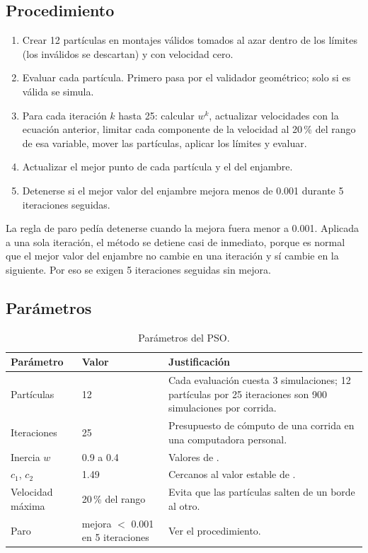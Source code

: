 \documentclass[11pt,letterpaper]{article}
\begin{document}
\begin{table}[H]
\centering
\caption{Límites de búsqueda de cada variable.}
\label{tab:limites}

\end{table}

\subsection{Procedimiento}
\begin{enumerate}
\item Crear 12 partículas en montajes válidos tomados al azar dentro de los límites (los inválidos se descartan) y con velocidad cero.
\item Evaluar cada partícula. Primero pasa por el validador geométrico; solo si es válida se simula.
\item Para cada iteración $k$ hasta 25: calcular $w^k$, actualizar velocidades con la ecuación anterior, limitar cada componente de la velocidad al 20\,\% del rango de esa variable, mover las partículas, aplicar los límites y evaluar.
\item Actualizar el mejor punto de cada partícula y el del enjambre.
\item Detenerse si el mejor valor del enjambre mejora menos de 0.001 durante 5 iteraciones seguidas.
\end{enumerate}

La regla de paro pedía detenerse cuando la mejora fuera menor a 0.001. Aplicada a una sola iteración, el método se detiene casi de inmediato, porque es normal que el mejor valor del enjambre no cambie en una iteración y sí cambie en la siguiente. Por eso se exigen 5 iteraciones seguidas sin mejora.

\subsection{Parámetros}
\begin{table}[H]
\centering
\caption{Parámetros del PSO.}
\begin{tabularx}{\textwidth}{llX}
\toprule
Parámetro & Valor & Justificación \\
\midrule
Partículas & 12 & Cada evaluación cuesta 3 simulaciones; 12 partículas por 25 iteraciones son 900 simulaciones por corrida. \\
Iteraciones & 25 & Presupuesto de cómputo de una corrida en una computadora personal. \\
Inercia $w$ & 0.9 a 0.4 & Valores de \citet{shi1998}. \\
$c_1$, $c_2$ & 1.49 & Cercanos al valor estable de \citet{clerc2002}. \\
Velocidad máxima & 20\,\% del rango & Evita que las partículas salten de un borde al otro. \\
Paro & mejora $<$ 0.001 en 5 iteraciones & Ver el procedimiento. \\
\bottomrule
\end{tabularx}
\end{table}
\end{document}
